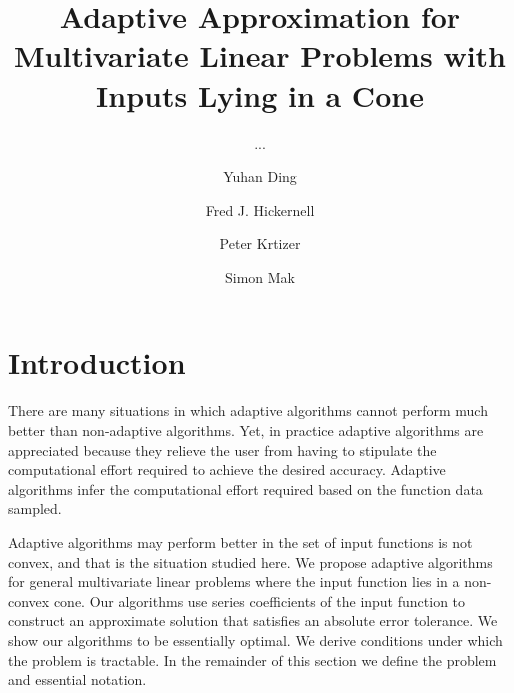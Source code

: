 \documentclass[USenglish]{article}
\begin{document}

  \author[1]{Yuhan Ding}
  \author*[2]{Fred J. Hickernell}
  \author[3]{Peter Krtizer} 
  \author[4]{Simon Mak}
  \title{Adaptive Approximation for Multivariate Linear Problems with Inputs Lying in a Cone}
  \subtitle{...}
  \aop

\maketitle


\section{Introduction} 

There are many situations in which adaptive algorithms cannot perform much better than non-adaptive algorithms.  Yet, in practice adaptive algorithms are appreciated because they relieve the user from having to stipulate the computational effort required to achieve the desired accuracy.  Adaptive algorithms infer the computational effort required based on the function data sampled.

Adaptive algorithms may perform better in the set of input functions is not convex, and that is the situation studied here. We propose adaptive algorithms for general multivariate linear problems where the input function lies in a non-convex cone.  Our algorithms use series coefficients of the input function to construct an approximate solution that satisfies an absolute error tolerance.  We show our algorithms to be essentially optimal.  We derive conditions under which the problem is tractable.  In the remainder of this section we define the problem and essential notation.

\end{document}
